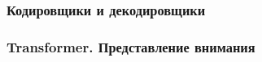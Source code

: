


\subsubsection{Кодировщики и декодировщики}



\subsubsection{Transformer. Представление внимания}





